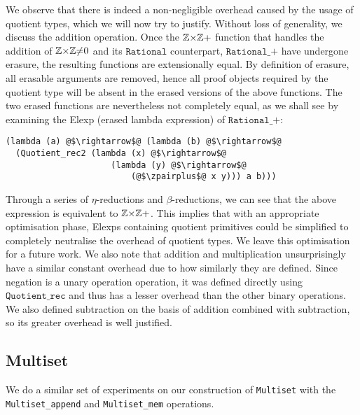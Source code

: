 \documentclass[12pt,twoside,maitrise]{dms}
\theoremstyle{definition}
\numberwithin{equation}{section}
\numberwithin{table}{chapter}
\numberwithin{figure}{chapter}
\newcommand\id[1] {\texttt{#1}}
\newcommand\fn[1] {\texttt{#1}}
\begin{document}
We observe that there is indeed a non-negligible overhead caused by the usage of
quotient types, which we will now try to justify. Without loss of generality, we
discuss the addition operation. Once the $\mathbb{Z}{\times}\mathbb{Z}+$ function that handles the
addition of $\mathbb{Z}{\times}\mathbb{Z}{\ne}0$ and its $\fn{Rational}$ counterpart, $\fn{Rational\_+}$
have undergone erasure, the resulting functions are extensionally equal. By
definition of erasure\cite{monnier2019typer}, all erasable arguments are
removed, hence all proof objects required by the quotient type will be absent in
the erased versions of the above functions. The two erased functions are
nevertheless not completely equal, as we shall see by examining the Elexp
(erased lambda expression)\cite{delaunay2017implementation} of
$\fn{Rational\_+}$:

\begin{verbatim}
(lambda (a) @$\rightarrow$@ (lambda (b) @$\rightarrow$@
  (Quotient_rec2 (lambda (x) @$\rightarrow$@
                     (lambda (y) @$\rightarrow$@
                         (@$\zpairplus$@ x y))) a b)))
\end{verbatim}

Through a series of $\eta$-reductions and $\beta$-reductions, we can see that
the above expression is equivalent to $\mathbb{Z}{\times}\mathbb{Z}+$. This implies that with an
appropriate optimisation phase, Elexps containing quotient primitives could be
simplified to completely neutralise the overhead of quotient types. We leave
this optimisation for a future work. We also note that addition and
multiplication unsurprisingly have a similar constant overhead due to how
similarly they are defined. Since negation is a unary operation operation, it
was defined directly using $\fn{Quotient\_rec}$ and thus has a lesser overhead
than the other binary operations. We also defined subtraction on the basis of
addition combined with subtraction, so its greater overhead is well justified.

\subsection*{Multiset}

We do a similar set of experiments on our construction of \id{Multiset} with the
\id{Multiset\_append} and \id{Multiset\_mem} operations.
\end{document}
